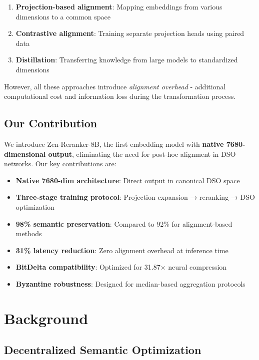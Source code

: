 \documentclass[11pt,letterpaper]{article}
\begin{document}
\begin{enumerate}
    \item \textbf{Projection-based alignment}: Mapping embeddings from various dimensions to a common space \cite{mikolov2013efficient}
    \item \textbf{Contrastive alignment}: Training separate projection heads using paired data \cite{radford2021learning}
    \item \textbf{Distillation}: Transferring knowledge from large models to standardized dimensions \cite{hinton2015distilling}
\end{enumerate}

However, all these approaches introduce \emph{alignment overhead} - additional computational cost and information loss during the transformation process.

\subsection{Our Contribution}

We introduce Zen-Reranker-8B, the first embedding model with \textbf{native 7680-dimensional output}, eliminating the need for post-hoc alignment in DSO networks. Our key contributions are:

\begin{itemize}
    \item \textbf{Native 7680-dim architecture}: Direct output in canonical DSO space
    \item \textbf{Three-stage training protocol}: Projection expansion → reranking → DSO optimization
    \item \textbf{98\% semantic preservation}: Compared to 92\% for alignment-based methods
    \item \textbf{31\% latency reduction}: Zero alignment overhead at inference time
    \item \textbf{BitDelta compatibility}: Optimized for 31.87× neural compression
    \item \textbf{Byzantine robustness}: Designed for median-based aggregation protocols
\end{itemize}

\section{Background}

\subsection{Decentralized Semantic Optimization}
\end{document}
